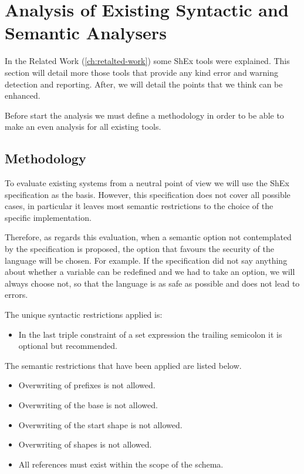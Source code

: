\chapter{Analysis of Existing Syntactic and Semantic Analysers}
\label{ch:current-analyzers-analysis}

In the Related Work (\cref{ch:retalted-work}) some ShEx tools were explained. This section will detail more
those tools that provide any kind error and warning detection and reporting. After, we will detail the points
that we think can be enhanced.

Before start the analysis we must define a methodology in order to be able to make an even analysis for all
existing tools.

\section{Methodology}
To evaluate existing systems from a neutral point of view we will use the ShEx specification as the basis.
However, this specification does not cover all possible cases, in particular it leaves most semantic restrictions
to the choice of the specific implementation.

Therefore, as regards this evaluation, when a semantic option not contemplated by the specification is proposed,
the option that favours the security of the language will be chosen. For example. If the specification did not say
anything about whether a variable can be redefined and we had to take an option, we will always choose not, so that
the language is as safe as possible and does not lead to errors.

The unique syntactic restrictions applied is:
\begin{itemize}
  \item In the last triple constraint of a set expression the trailing semicolon it is optional but recommended.
\end{itemize}

The semantic restrictions that have been applied are listed below.
\begin{itemize}
  \item Overwriting of prefixes is not allowed.
  \item Overwriting of the base is not allowed.
  \item Overwriting of the start shape is not allowed.
  \item Overwriting of shapes is not allowed.
  \item All references must exist within the scope of the schema.
\end{itemize}

